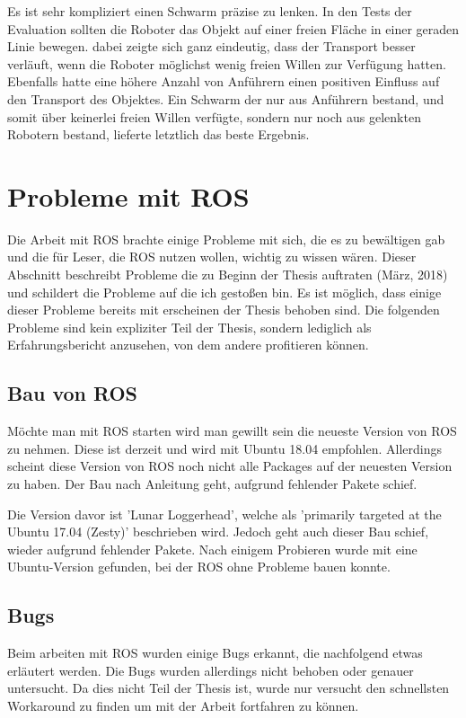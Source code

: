 Es ist sehr kompliziert einen Schwarm präzise zu lenken. In den Tests der Evaluation sollten die Roboter das Objekt auf einer freien Fläche in einer geraden Linie bewegen. dabei zeigte sich ganz eindeutig, dass der Transport besser verläuft, wenn die Roboter möglichst wenig freien Willen zur Verfügung hatten. Ebenfalls hatte eine höhere Anzahl von Anführern einen positiven Einfluss auf den Transport des Objektes. Ein Schwarm der nur aus Anführern bestand, und somit über keinerlei freien Willen verfügte, sondern nur noch aus gelenkten Robotern bestand, lieferte letztlich das beste Ergebnis.

\section{Probleme mit ROS}
Die Arbeit mit ROS brachte einige Probleme mit sich, die es zu bewältigen gab und die für Leser, die ROS nutzen wollen, wichtig zu wissen wären. Dieser Abschnitt beschreibt Probleme die zu Beginn der Thesis auftraten (März, 2018) und schildert die Probleme auf die ich gestoßen bin. Es ist möglich, dass einige dieser Probleme bereits mit erscheinen der Thesis behoben sind. Die folgenden Probleme sind kein expliziter Teil der Thesis, sondern lediglich als Erfahrungsbericht anzusehen, von dem andere profitieren können.

\subsection*{Bau von ROS}
Möchte man mit ROS starten wird man gewillt sein die neueste Version von ROS zu nehmen. Diese ist derzeit  und wird mit Ubuntu 18.04 empfohlen. Allerdings scheint diese Version von ROS noch nicht alle Packages auf der neuesten Version zu haben. Der Bau nach Anleitung geht, aufgrund fehlender Pakete schief.

Die Version davor ist 'Lunar Loggerhead', welche als 'primarily targeted at the Ubuntu 17.04 (Zesty)' beschrieben wird. Jedoch geht auch dieser Bau schief, wieder aufgrund fehlender Pakete. Nach einigem Probieren wurde mit  eine Ubuntu-Version gefunden, bei der ROS ohne Probleme bauen konnte.

\subsection*{Bugs}
Beim arbeiten mit ROS wurden einige Bugs erkannt, die nachfolgend etwas erläutert werden. Die Bugs wurden allerdings nicht behoben oder genauer untersucht. Da dies nicht Teil der Thesis ist, wurde nur versucht den schnellsten Workaround zu finden um mit der Arbeit fortfahren zu können.

